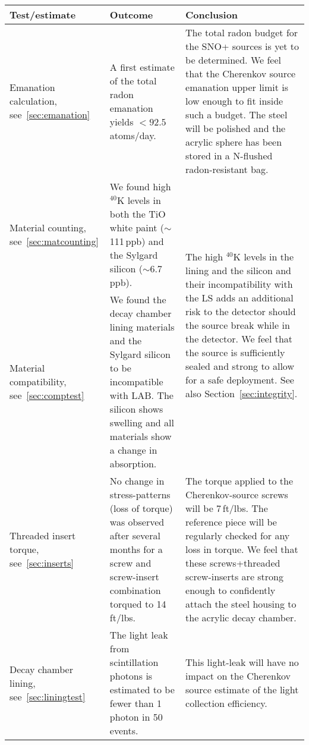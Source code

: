 \begin{table}[p]
\centering
\normalsize
\begin{tabular}{|p{2.7cm}|p{6cm}|p{7.3cm}|} \hline
Test/estimate           & Outcome  & Conclusion \\ \hline

Emanation calculation, see~\ref{sec:emanation}   
                        & A first estimate of the total radon emanation yields $<92.5$ atoms/day.
                        & The total radon budget for the SNO+ sources is yet to be determined. We feel that the Cherenkov source emanation upper limit is low enough to fit inside such a budget. The steel will be polished and the acrylic sphere has been stored in a N-flushed radon-resistant bag.\\ \hline   

Material counting, see~\ref{sec:matcounting}      
                        & We found high $^{40}$K levels in both the TiO white paint ($\sim$111\,ppb) and the Sylgard silicon ($\sim$6.7\,ppb). 
                        & \multirow{2}{7cm}{The high $^{40}$K levels in the lining and the silicon and their incompatibility with the LS adds an additional risk to the detector should the source break while in the detector. We feel that the source is sufficiently sealed and strong to allow for a safe deployment. See also Section~\ref{sec:integrity}.} \\ \cline{1-2}
                        
Material compatibility, see~\ref{sec:comptest}  
                        & We found the decay chamber lining materials and the Sylgard silicon to be incompatible with LAB. The silicon shows swelling and all materials show a change in absorption. 
                        & \\ \hline
                                             
Threaded insert torque, see~\ref{sec:inserts}
                        & No change in stress-patterns (loss of torque) was observed after several months for a screw and screw-insert combination torqued to 14\,ft/lbs.
                        & The torque applied to the Cherenkov-source screws will be 7\,ft/lbs. The reference piece will be regularly checked for any loss in torque. We feel that these screws+threaded screw-inserts are strong enough to confidently attach the steel housing to the acrylic decay chamber. \\  \hline
                        
Decay chamber lining, see~\ref{sec:liningtest}
                        & The light leak from scintillation photons is estimated to be fewer than 1 photon in 50 events.
                        & This light-leak will have no impact on the Cherenkov source estimate of the light collection efficiency. \\ \hline


\end{tabular}
\end{table}
